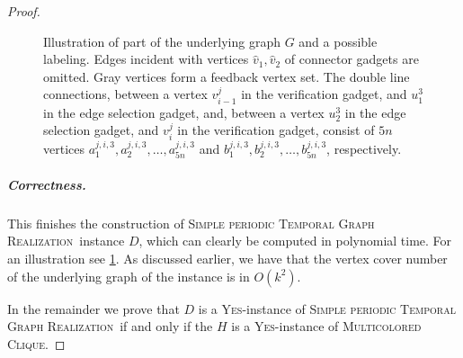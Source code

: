 \documentclass[a4paper,UKenglish,cleveref, autoref, thm-restate]{lipics-v2021}
\newcommand{\deltaExactLong}{\textsc{Simple periodic Temporal Graph Realization}}
\begin{document}
\begin{proof}
\begin{figure}%
\noindent{}
    \caption{Illustration of part of the underlying graph $G$ and a possible labeling. Edges incident with vertices $\hat{v}_1,\hat{v}_2$ of connector gadgets are omitted. Gray vertices form a feedback vertex set.
    The double line connections, between a vertex $v_{i-1}^j$ in the verification gadget, and $u_1^3$ in the edge selection gadget, 
    and, between a vertex $u_2^3$ in the edge selection gadget, and $v_{i}^j$ in the verification gadget,
    consist of $5n$ vertices $a_1^{j,i,3},a_2^{j,i,3},\dots,a_{5n}^{j,i,3}$ 
    and $b_1^{j,i,3},b_2^{j,i,3},\dots,b_{5n}^{j,i,3}$, respectively.
    }\label{fig:hardness1}
\end{figure}


\subparagraph{Correctness.} This finishes the construction of \deltaExactLong\ instance $D$, which can clearly be computed in polynomial time. For an illustration see \cref{fig:hardness1}. As discussed earlier, we have that the vertex cover number of the underlying graph of the instance is in $O(k^2)$.

In the remainder we prove that $D$ is a \textsc{Yes}-instance of \deltaExactLong\ if and only if the $H$ is a \textsc{Yes}-instance of \textsc{Multicolored Clique}.


\end{proof}
\end{document}

